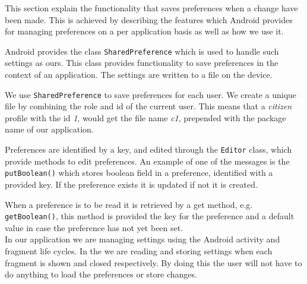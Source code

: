 This section explain the functionality that saves preferences when a change have been made. This is achieved by describing the features which Android provides for managing preferences on a per application basis as well as how we use it.

Android provides the class \lstinline|SharedPreference| which is used to handle such settings as ours.
This class provides functionality to save preferences in the context of an application.
The settings are written to a file on the device.

We use \lstinline|SharedPreference| to save preferences for each user. We create a unique file by combining the role and id of the current user.
This means that a \textit{citizen} profile with the id \textit{1}, would get the file name \textit{c1}, prepended with the package name of our application.

Preferences are identified by a key, and edited through the \lstinline|Editor| class, which provide methods to edit preferences.
An example of one of the messages is the \lstinline!putBoolean()! which stores boolean field in a preference, identified with a provided key.
If the preference exists it is updated if not it is created.

When a preference is to be read it is retrieved by a get method, e.g. \lstinline!getBoolean()!, this method is provided the key for the preference and a default value in case the preference has not yet been set.\\

In our application we are managing settings using the Android activity and fragment life cycles.
In the \settingsactivity we are reading and storing settings when each fragment is shown and closed respectively. By doing this the user will not have to do anything to load the preferences or store changes.
